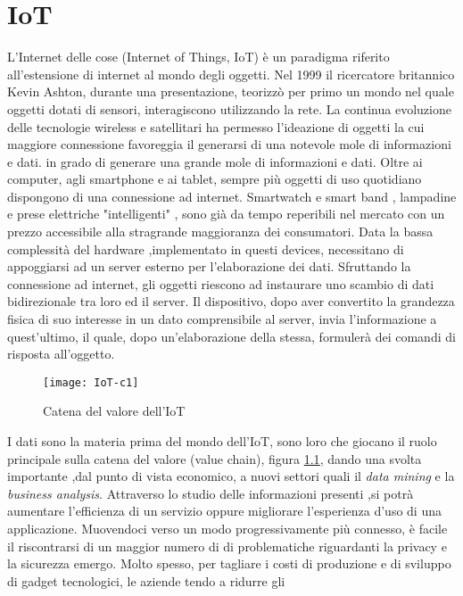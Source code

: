 \chapter{IoT}
L'Internet delle cose (Internet of Things, IoT) è un paradigma riferito
all’estensione di internet al mondo degli oggetti. Nel 1999 il ricercatore
britannico Kevin Ashton, durante una presentazione, teorizzò  per primo un mondo
nel quale oggetti dotati di sensori, interagiscono utilizzando la rete.  La
continua evoluzione delle tecnologie wireless e satellitari ha permesso
l'ideazione di oggetti la cui maggiore connessione favoreggia il generarsi
di una notevole mole di informazioni e dati.
in grado di generare una grande mole
di informazioni e dati. Oltre ai computer, agli smartphone e ai tablet, sempre più
oggetti di uso quotidiano dispongono di una connessione ad internet. Smartwatch
e smart band , lampadine e prese elettriche "intelligenti" ,  sono già da tempo
reperibili nel mercato con un prezzo accessibile alla stragrande maggioranza dei
consumatori.  Data la bassa
complessità del hardware ,implementato in questi devices, necessitano di
appoggiarsi ad un server esterno per l'elaborazione dei dati.  Sfruttando la
connessione ad internet, gli oggetti riescono ad instaurare uno scambio di dati
bidirezionale tra loro ed il server. Il dispositivo,  dopo aver
convertito la grandezza fisica di suo interesse in un dato comprensibile al
server, invia l'informazione a quest'ultimo, il quale, dopo un'elaborazione della
stessa, formulerà dei comandi di risposta all'oggetto.
\\
\begin{figure}[ht]
        \centering 
                \texttt{[image: IoT-c1]}
        \caption{Catena del valore dell'IoT}
        \label{fig:IoT_chain}
\end{figure}
I dati sono la materia prima del mondo dell'IoT, sono loro che giocano il ruolo
principale sulla catena del valore (value chain), figura \ref{fig:IoT_chain},
dando una svolta importante ,dal
punto di vista economico, a nuovi settori quali il \emph{data mining} e la
\emph{business analysis}.
Attraverso lo studio delle informazioni presenti ,si potrà  aumentare l’efficienza di un
servizio oppure  migliorare l'esperienza d'uso di una applicazione.
Muovendoci verso un modo progressivamente più connesso, è facile il riscontrarsi
di un maggior numero di 
di problematiche riguardanti la
privacy e la sicurezza emergo.  Molto spesso, per tagliare i costi di produzione e
di sviluppo di gadget tecnologici, le aziende tendo a ridurre gli
